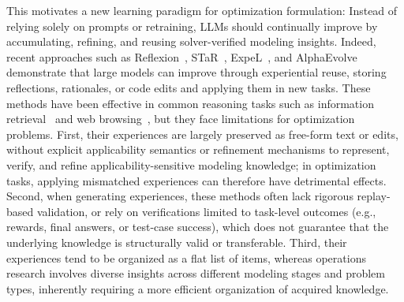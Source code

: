 \documentclass[sigconf, nonacm]{acmart}
\begin{document}
This motivates a new learning paradigm for optimization formulation: Instead of relying solely on prompts or retraining, LLMs should continually improve by accumulating, refining, and reusing solver-verified modeling insights. Indeed, recent approaches such as Reflexion~\citep{shinn2023reflexion}, STaR~\citep{zelikman2022star}, ExpeL~\citep{zhao2024expel}, and AlphaEvolve~\citep{novikov2025alphaevolve} demonstrate that large models can improve through experiential reuse, storing reflections, rationales, or code edits and applying them in new tasks. These methods have been effective in common reasoning tasks such as information retrieval~\citep{yang-etal-2018-hotpotqa} and web browsing~\citep{yao2022webshop}, but they face limitations for optimization problems. First, their experiences are largely preserved as free-form text or edits, without explicit applicability semantics or refinement mechanisms to represent, verify, and refine applicability-sensitive modeling knowledge; in optimization tasks, applying mismatched experiences can therefore have detrimental effects. Second, when generating experiences, these methods often lack rigorous replay-based validation, or rely on verifications limited to task-level outcomes (e.g., rewards, final answers, or test-case success), which does not guarantee that the underlying knowledge is structurally valid or transferable. Third, their experiences tend to be organized as a flat list of items, whereas operations research involves diverse insights across different modeling stages and problem types, inherently requiring a more efficient organization of acquired knowledge.
\end{document}
